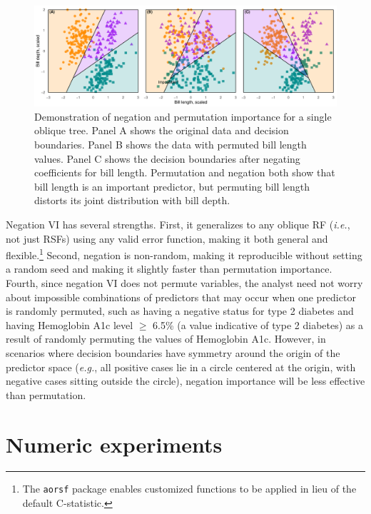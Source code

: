\documentclass[12pt]{article}\usepackage[]{graphicx}\usepackage[]{xcolor}
\makeatletter
\def\maxwidth{ %
  \ifdim\Gin@nat@width>\linewidth
    \linewidth
  \else
    \Gin@nat@width
  \fi
}
\newenvironment{knitrout}{}{} %
\newcommand{\ie}{\textit{i.e.}}
\newcommand{\eg}{\textit{e.g.}}
\makeatother
\begin{document}
\begin{knitrout}
\color{fgcolor}\begin{figure}
\includegraphics[width=\maxwidth]{figure/negation_vs_permutation_viz-1} \caption[Demonstration of negation and permutation importance for a single oblique tree]{Demonstration of negation and permutation importance for a single oblique tree. Panel A shows the original data and decision boundaries. Panel B shows the data with permuted bill length values. Panel C shows the decision boundaries after negating coefficients for bill length. Permutation and negation both show that bill length is an important predictor, but permuting bill length distorts its joint distribution with bill depth.}\label{fig:negation_vs_permutation_viz}
\end{figure}

\end{knitrout}


Negation VI has several strengths. First, it generalizes to any oblique RF (\ie, not just RSFs) using any valid error function, making it both general and flexible.\footnote{The \texttt{aorsf} package enables customized functions to be applied in lieu of the default C-statistic.} Second, negation is non-random, making it reproducible without setting a random seed and making it slightly faster than permutation importance. Fourth, since negation VI does not permute variables, the analyst need not worry about impossible combinations of predictors that may occur when one predictor is randomly permuted, such as having a negative status for type 2 diabetes and having Hemoglobin A1c level $\geq$ 6.5\% (a value indicative of type 2 diabetes) as a result of randomly permuting the values of Hemoglobin A1c. However, in scenarios where decision boundaries have symmetry around the origin of the predictor space (\eg, all positive cases lie in a circle centered at the origin, with negative cases sitting outside the circle), negation importance will be less effective than permutation.


\section{Numeric experiments} \label{sec:numeric}
\end{document}
